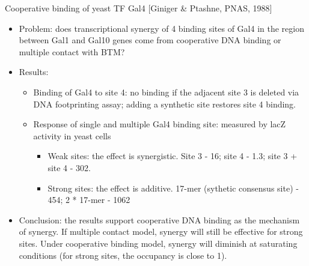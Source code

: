 \documentclass{report}
\begin{document}
Cooperative binding of yeast TF Gal4 [Giniger \& Ptashne, PNAS, 1988]
\begin{itemize}
	\item Problem: does transcriptional synergy of 4 binding sites of Gal4 in the region between Gal1 and Gal10 genes come from cooperative DNA binding or multiple contact with BTM? 
	
	\item Results: 
	\begin{itemize}
		\item Binding of Gal4 to site 4: no binding if the adjacent site 3 is deleted via DNA footprinting assay; adding a synthetic site restores site 4 binding. 
		\item Response of single and multiple Gal4 binding site: measured by lacZ activity in yeast cells
		\begin{itemize}
			\item Weak sites: the effect is synergistic. Site 3 - 16; site 4 - 1.3; site 3 + site 4 - 302. 
			\item Strong sites: the effect is additive. 17-mer (sythetic consensus site) - 454; 2 * 17-mer - 1062
		\end{itemize}
	\end{itemize}
	
	\item Conclusion: the results support cooperative DNA binding as the mechanism of synergy. If multiple contact model, synergy will still be effective for strong sites. Under cooperative binding model, synergy will diminish at saturating conditions (for strong sites, the occupancy is close to 1). 
\end{itemize}
\end{document}
